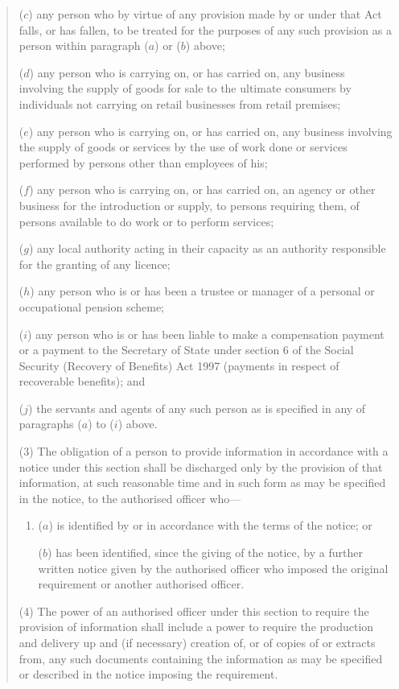 \documentclass[12pt,a4paper]{article}
\begin{document}
\begin{quotation}
\begin{enumerate}
($c$) any person who by virtue of any provision made by or under that Act falls, or has fallen, to be treated for the purposes of any such provision as a person within paragraph ($a$)  or ($b$)  above;

($d$) any person who is carrying on, or has carried on, any business involving the supply of goods for sale to the ultimate consumers by individuals not carrying on retail businesses from retail premises;

($e$) any person who is carrying on, or has carried on, any business involving the supply of goods or services by the use of work done or services performed by persons other than employees of his;

($f$) any person who is carrying on, or has carried on, an agency or other business for the introduction or supply, to persons requiring them, of persons available to do work or to perform services;

($g$) any local authority acting in their capacity as an authority responsible for the granting of any licence;

($h$) any person who is or has been a trustee or manager of a personal or occupational pension scheme;

($i$) any person who is or has been liable to make a compensation payment or a payment to the Secretary of State under section 6 of the Social Security (Recovery of Benefits) Act 1997 (payments in respect of recoverable benefits); and

($j$) the servants and agents of any such person as is specified in any of paragraphs ($a$)  to ($i$)  above.
\end{enumerate}

(3) The obligation of a person to provide information in accordance with a notice under this section shall be discharged only by the provision of that information, at such reasonable time and in such form as may be specified in the notice, to the authorised officer who—
\begin{enumerate}\item[]
($a$) is identified by or in accordance with the terms of the notice; or

($b$) has been identified, since the giving of the notice, by a further written notice given by the authorised officer who imposed the original requirement or another authorised officer.
\end{enumerate}

(4) The power of an authorised officer under this section to require the provision of information shall include a power to require the production and delivery up and (if necessary) creation of, or of copies of or extracts from, any such documents containing the information as may be specified or described in the notice imposing the requirement.


\end{quotation}
\end{document}

